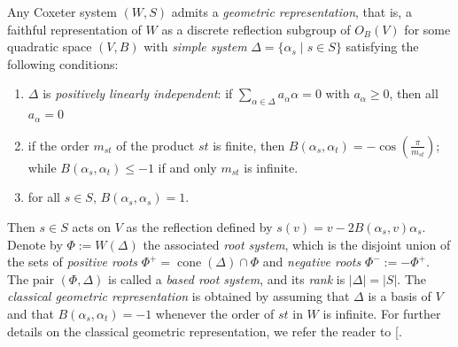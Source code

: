 \documentclass{amsart}
\theoremstyle{definition}
\newcommand{\cone}{\operatorname{cone}}
\begin{document}
Any Coxeter system $(W,S)$ admits a {\em geometric representation}, that is, a faithful representation of $W$ as a discrete reflection subgroup of $O_B(V)$ for some quadratic space $(V,B)$ with {\em simple system} $\Delta = \{\alpha_s \mid s \in S\}$ satisfying  the following conditions:
\begin{enumerate}
    \item  $\Delta$ is {\em positively linearly independent}: if $\sum_{\alpha \in \Delta} a_{\alpha} \alpha=0$ with $a_\alpha \geq 0$, then all $a_\alpha = 0$
\item if the order $m_{st}$ of the product $st$ is finite, then $B(\alpha_s,\alpha_t) = -\cos\left(\frac{\pi}{m_{st}}\right)$; while $B(\alpha_s,\alpha_t) \leq -1$ if and only $m_{st}$ is infinite.
\item for all $s\in S$, $B(\alpha_s,\alpha_s)=1.$ 
\end{enumerate}
Then $s\in S$ acts on $V$ as the reflection defined by $s(v)=v-2B(\alpha_s,v)\alpha_s$. Denote by $\Phi := W(\Delta)$ the associated {\em  root system}, which is the disjoint union of the sets of {\em positive roots } $\Phi^+=\cone(\Delta)\cap \Phi$ and {\em negative roots} $\Phi^-:=-\Phi^+$.
The pair $(\Phi,\Delta)$ is called a {\em based root system}, and its {\em rank} is $|\Delta| = |S|$. The {\em classical geometric representation} is obtained by assuming that $\Delta$ is a basis of $V$ and that $B(\alpha_s,\alpha_t) = -1$ whenever the order of $st$ in $W$ is infinite. For further details on the classical geometric representation, we refer the reader to [\cite[\S4.1]{BB}.

\end{document}
